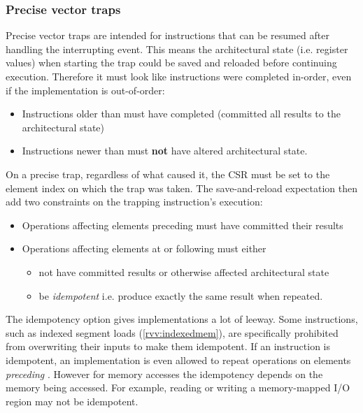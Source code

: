 \subsubsection{Precise vector traps}
Precise vector traps are intended for instructions that can be resumed after handling the interrupting event.
This means the architectural state (i.e. register values) when starting the trap could be saved and reloaded before continuing execution.
Therefore it must look like instructions were completed in-order, even if the implementation is out-of-order:
\begin{itemize}
    \item Instructions older than  must have completed (committed all results to the architectural state)
    \item Instructions newer than  must \textbf{not} have altered architectural state.
\end{itemize}

On a precise trap, regardless of what caused it, the  CSR must be set to the element index on which the trap was taken.
The save-and-reload expectation then add two constraints on the trapping instruction's execution:
\begin{itemize}
    \item Operations affecting elements preceding  must have committed their results
    \item Operations affecting elements at or following  must either
    \begin{itemize}
        \item not have committed results or otherwise affected architectural state
        \item be \emph{idempotent} i.e. produce exactly the same result when repeated.
    \end{itemize}
\end{itemize}

The idempotency option gives implementations a lot of leeway.
Some instructions, such as  indexed segment loads (\cref{rvv:indexedmem}), are specifically prohibited from overwriting their inputs to make them idempotent.
If an instruction is idempotent, an implementation is even allowed to repeat operations on elements \emph{preceding} .
However for memory accesses the idempotency depends on the memory being accessed.
For example, reading or writing a memory-mapped I/O region may not be idempotent.

